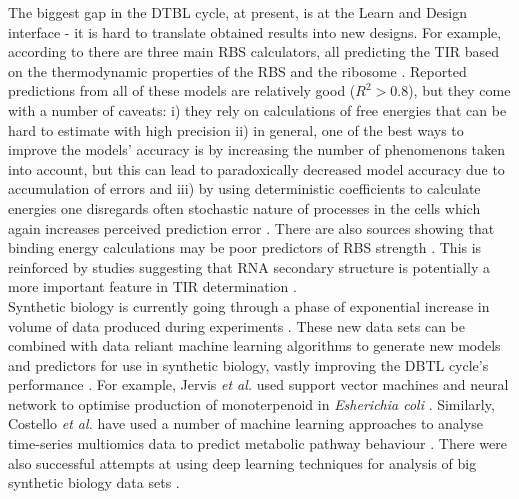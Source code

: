 \documentclass{article}
\begin{document}
The biggest gap in the DTBL cycle, at present, is at the Learn and Design interface - it is hard to translate obtained results into new designs.
For example, according to  \textcite{Reeve2014} there are three main RBS calculators, all predicting the TIR based on the thermodynamic properties of the RBS and the ribosome \cite{Seo2013,Na2010,Salis2009}. 
Reported predictions from all of these models are relatively good ($R^2 >0.8$), 
but they come with a number of caveats: i) they rely on calculations of free energies that can be hard to estimate with high precision ii) in general, one of the best ways to improve the models' accuracy is by increasing the number of phenomenons taken into account, but this can lead to paradoxically decreased model accuracy due to accumulation of errors \cite{EspahBorujeni2016} and iii) by using deterministic coefficients to calculate energies one disregards often stochastic nature of processes in the cells which again increases perceived prediction error \cite{Goss1998}. 
There are also sources showing that binding energy calculations may be poor predictors of RBS strength \cite{Saito2020,Sherer1980}. This is reinforced by studies suggesting that RNA secondary structure is potentially a more important feature in TIR determination \cite{DESMIT1994,EspahBorujeni2016}.\\

Synthetic biology is currently going through a phase of exponential increase in volume of data produced during experiments \cite{Freemont2019}. 
These new data sets can be combined with data reliant machine learning algorithms to generate new models and predictors for use in synthetic biology, vastly improving the DBTL cycle's performance \cite{Camacho2018,Radivojevic2020,LAWSON2021}. 
For example, Jervis \emph{et al.} used support vector machines and neural network to optimise production of monoterpenoid in \emph{Esherichia coli} \cite{Jervis2019}.
Similarly, Costello \emph{et al.} have used a number of machine learning approaches to analyse time-series multiomics data to predict metabolic pathway behaviour \cite{Costello2018}.
There were also successful attempts at using deep learning techniques for analysis of big synthetic biology data sets \cite{Alipanahi2015,Angermueller2016}.\\
\end{document}
